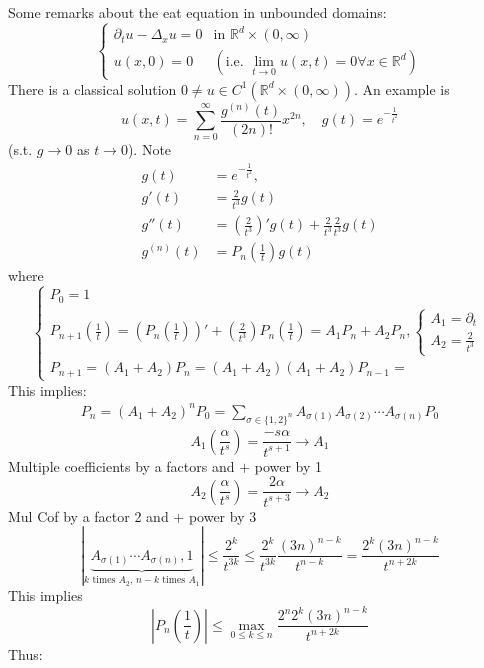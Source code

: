 \documentclass{report}
\theoremstyle{tommy}
\begin{document}
  Some remarks about the eat equation in unbounded domains:
  \[\begin{cases}
    \partial_t u - \Delta_x u = 0 &\text{in } \mathbb{R}^d \times (0,\infty) \\
    u(x,0) = 0 &(\text{i.e. \(\lim_{t \to 0} u(x,t) = 0 \forall x \in \mathbb{R}^d\)})
  \end{cases}\]
  There is a classical solution \(0\ne u \in C^1(\mathbb{R}^d \times (0,\infty))\).
  An example is 
  \[u(x,t) = \sum_{n=0}^\infty \frac{g^{(n)}(t)}{(2n)!} x^{2n}, \quad g(t) = e^{-\frac{1}{t^2}}\]
  (s.t. \(g \to 0\) as \(t \to 0\)). Note
  \begin{align*}
    g(t) &= e^{- \frac{1}{t^2}}, \\
    g'(t) &= \frac{2}{t^3} g(t) \\
    g''(t) &= \left(\frac{2}{t^3}\right)'g(t) + \frac{2}{t^3} \frac{2}{t^3} g(t) \\
    g^{(n)}(t) &= P_n \left(\frac{1}{t}\right)g(t)
  \end{align*}
  where
  \[\begin{cases}
    P_0 = 1 \\ P_{n+1} \left(\frac{1}{t}\right) = \left(P_n\left(\frac{1}{t}\right)\right)' + \left(\frac{2}{t^3}\right)P_n \left(\frac{1}{t}\right) = A_1 P_n + A_2 P_n, \begin{cases}
      A_1 = \partial_t \\ A_2 = \frac{2}{t^3}
    \end{cases}\\
    P_{n+1} = (A_1 + A_2) P_n = (A_1 + A_2) (A_1 + A_2)P_{n-1} = 
  \end{cases}\]
  This implies:
  \begin{align*}
    P_n = (A_1 + A_2)^n P_0 = \sum_{\sigma \in \{1,2\}^n} A_{\sigma(1)} A_{\sigma(2)} \cdots A_{\sigma(n)} P_0
  \end{align*}
  \[A_1 \left(\frac{\alpha}{t^s}\right) = \frac{-s\alpha}{t^{s+1}} \to A_1\]
  Multiple coefficients by a factors and \(+\) power by 1
  \[A_2 \left(\frac{\alpha}{t^s}\right) = \frac{2\alpha}{t^{s+3}} \to A_2\]
  Mul Cof by a factor 2 and + power by 3
  \[|\underbrace{A_{\sigma(1)} \cdots A_{\sigma(n)},1}_{\text{\(k\) times \(A_2\), \(n-k\) times \(A_1\)}}| \le \frac{2^k}{t^{3k}} \le \frac{2^k}{t^{3k}} \frac{(3n)^{n-k}}{t^{n-k}} = \frac{2^k(3n)^{n-k}}{t^{n+2k}}\]
  This implies 
  \[|P_n \left(\frac{1}{t}\right)| \le \max_{0 \le k \le n} \frac{2^n 2^k (3n)^{n-k}}{t^{n+2k}}\]
  Thus:
\end{document}
